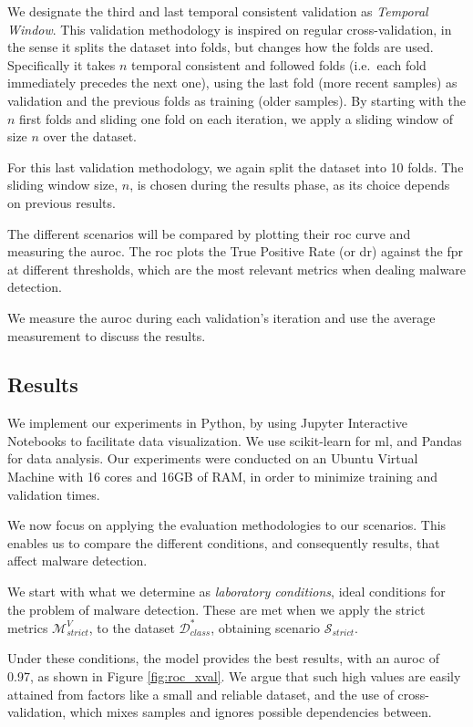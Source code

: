 We designate the third and last temporal consistent validation as \textit{Temporal Window}. This validation methodology is inspired on regular cross-validation, in the sense it splits the dataset into folds, but changes how the folds are used. Specifically it takes $n$  temporal consistent and followed folds (i.e.\ each fold immediately precedes the next one), using the last fold (more recent samples) as validation and the previous folds as training (older samples). By starting with the $n$ first folds and sliding one fold on each iteration, we apply a sliding window of size $n$ over the dataset.

For this last validation methodology, we again split the dataset into 10 folds. The sliding window size, $n$, is chosen during the results phase, as its choice depends on previous results.

The different scenarios will be compared by plotting their \gls{roc} curve and measuring the \gls{auroc}. The \gls{roc} plots the True Positive Rate (or \gls{dr}) against the \gls{fpr} at different thresholds, which are the most relevant metrics when dealing malware detection.

We measure the \gls{auroc} during each validation's iteration and use the average measurement to discuss the results.

\subsection{Results}

We implement our experiments in Python, by using Jupyter Interactive Notebooks\cite{tool:jupyter} to facilitate data visualization. We use scikit-learn\cite{tool:sklearn} for \gls{ml}, and Pandas\cite{tool:pandas} for data analysis. Our experiments were conducted on an Ubuntu Virtual Machine with 16 cores and 16GB of RAM, in order to minimize training and validation times.

We now focus on applying the evaluation methodologies to our scenarios. This enables us to compare the different conditions, and consequently results, that affect malware detection.

We start with what we determine as \textit{laboratory conditions}, ideal conditions for the problem of malware detection. These are met when we apply the strict metrics $\mathcal{M}_{strict}^V$, to the dataset $\mathcal{D}_{class}^*$, obtaining scenario $\mathcal{S}_{strict}$.

Under these conditions, the model provides the best results, with an \gls{auroc} of 0.97, as shown in Figure \ref{fig:roc_xval}. We argue that such high values are easily attained from factors like a small and reliable dataset, and the use of cross-validation, which mixes samples and ignores possible dependencies between.

